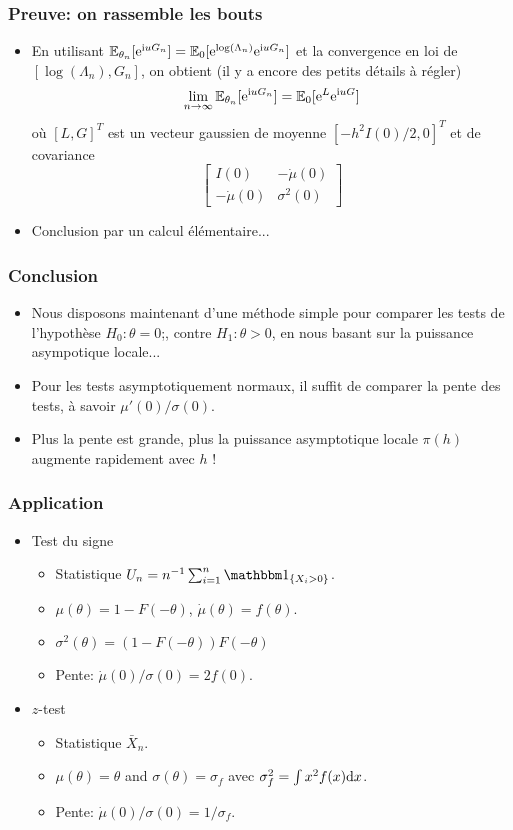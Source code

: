 \begin{frame}
\frametitle{Preuve: on rassemble les bouts}
\begin{itemize}
\item En utilisant $\operatorname{{\mathbb E}}_{\theta_n}[ \mathrm{e}^{\mathrm{i} u G_n}] = \operatorname{{\mathbb E}}_0[ \mathrm{e}^{\log(\Lambda_n)} \mathrm{e}^{\mathrm{i} u G_n}]$ et
la convergence en loi de $[\log(\Lambda_n), G_n]$, on obtient (il y a encore des petits détails à régler)
\[
\lim_{n \to \infty} \operatorname{{\mathbb E}}_{\theta_n}[ \mathrm{e}^{\mathrm{i} u G_n}]= \operatorname{{\mathbb E}}_0[ \mathrm{e}^{L} \mathrm{e}^{\mathrm{i} u G}]
\]
où $[L,G]^T$ est un vecteur gaussien de moyenne $[-h^2 I(0)/2,0]^T$ et de covariance
\[
\left[
\begin{array}{cc}
I(0) & -\dot \mu(0) \\
-\dot \mu(0) & \sigma^2(0)
\end{array}
\right]
\]
\item Conclusion par un calcul élémentaire...
\end{itemize}
\end{frame}

\begin{frame}
\frametitle{Conclusion}
\begin{itemize}
\item Nous disposons maintenant d'une méthode simple pour comparer les tests de l'hypothèse $H_0: \theta = 0$;, contre $H_1: \theta > 0$, en nous basant sur la puissance asympotique locale...
\item Pour les tests asymptotiquement normaux, il suffit de comparer la \alert{pente} des tests, à savoir \alert{$\mu'(0)/\sigma(0)$}.
\item Plus la pente est grande, plus la puissance asymptotique locale $\pi(h)$ augmente rapidement avec $h$ !
\end{itemize}
\end{frame}


\begin{frame}
\frametitle{Application}
\begin{itemize}
\item Test du signe
\begin{itemize}
\item Statistique $U_n= n^{-1} \sum_{i=1}^n \indi{X_i > 0}$.
\item $\mu(\theta)= 1 - F(-\theta)$, $\dot \mu(\theta)=  f(\theta)$.
\item $\sigma^2(\theta)= (1 - F(-\theta)) F(-\theta)$
\item \alert{Pente:} $\dot\mu(0)/\sigma(0)= 2 f(0)$.
\end{itemize}
\item $z$-test
\begin{itemize}
\item Statistique $\bar{X}_n$.
\item $\mu(\theta)= \theta$ and $\sigma(\theta)= \sigma_f$ avec $\sigma^2_f = \int x^2 f(x) \mathrm{d} x$.
\item \alert{Pente:} $\dot\mu(0)/\sigma(0)= 1/\sigma_f$.
\end{itemize}
\end{itemize}
\end{frame}


